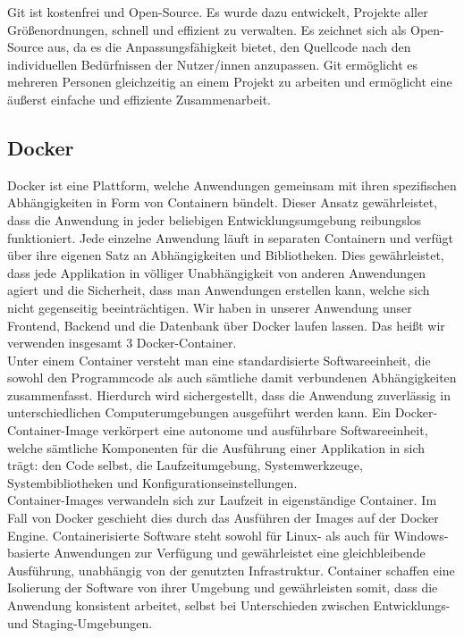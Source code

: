 Git ist kostenfrei und Open-Source. Es wurde dazu entwickelt, Projekte aller 
Größenordnungen, schnell und effizient zu verwalten. 
Es zeichnet sich als Open-Source aus, da es die Anpassungsfähigkeit bietet, den Quellcode 
nach den individuellen Bedürfnissen der Nutzer/innen anzupassen. 
Git ermöglicht es mehreren Personen gleichzeitig an einem 
Projekt zu arbeiten und ermöglicht eine äußerst einfache und effiziente Zusammenarbeit. 
\cite{git_features}
\newpage

\subsection*{Docker}

Docker ist eine Plattform, welche Anwendungen gemeinsam mit ihren spezifischen Abhängigkeiten 
in Form von Containern bündelt. Dieser Ansatz gewährleistet, dass die Anwendung in 
jeder beliebigen Entwicklungsumgebung reibungslos funktioniert.
Jede einzelne Anwendung läuft in separaten Containern und verfügt über 
ihre eigenen Satz an Abhängigkeiten und Bibliotheken. Dies gewährleistet, dass jede 
Applikation in völliger Unabhängigkeit von anderen Anwendungen agiert und die Sicherheit, 
dass man Anwendungen erstellen kann, welche sich nicht gegenseitig beeinträchtigen.
Wir haben in unserer Anwendung unser Frontend, Backend und die Datenbank über Docker laufen lassen.
Das heißt wir verwenden insgesamt 3 Docker-Container. \cite{docker_explained} \\
 
Unter einem Container versteht man eine standardisierte Softwareeinheit, die sowohl den 
Programmcode als auch sämtliche damit verbundenen Abhängigkeiten zusammenfasst. 
Hierdurch wird sichergestellt, dass die Anwendung zuverlässig in unterschiedlichen 
Computerumgebungen ausgeführt werden kann. Ein Docker-Container-Image verkörpert eine 
autonome und ausführbare Softwareeinheit, welche sämtliche Komponenten für die Ausführung 
einer Applikation in sich trägt: den Code selbst, die Laufzeitumgebung, Systemwerkzeuge, 
Systembibliotheken und Konfigurationseinstellungen. \cite{docker_container} \\

Container-Images verwandeln sich zur Laufzeit in eigenständige Container. 
Im Fall von Docker geschieht dies durch das Ausführen der Images auf der Docker Engine. 
Containerisierte Software steht sowohl für Linux- als auch für Windows-basierte Anwendungen 
zur Verfügung und gewährleistet eine gleichbleibende Ausführung, unabhängig von der genutzten 
Infrastruktur. Container schaffen eine Isolierung der Software von ihrer Umgebung und 
gewährleisten somit, dass die Anwendung konsistent arbeitet, selbst bei Unterschieden 
zwischen Entwicklungs- und Staging-Umgebungen. \cite{docker_container}
\newpage
